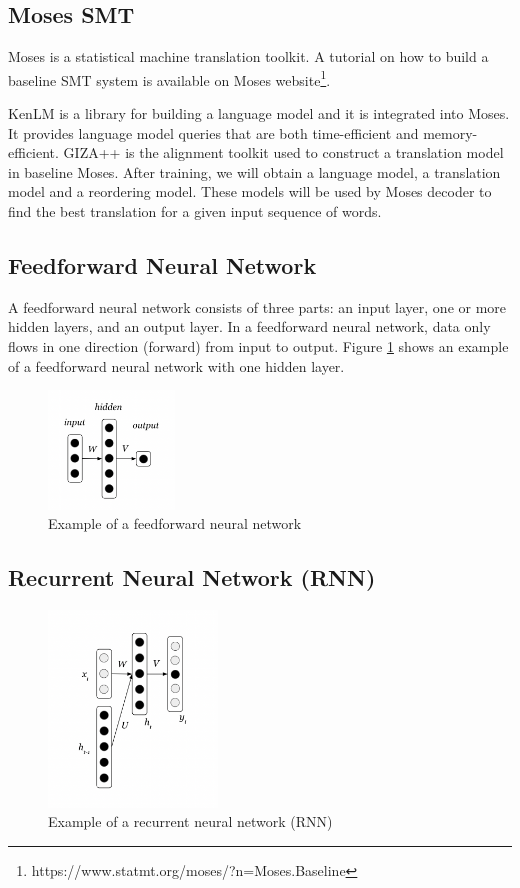 \documentclass[12pt,a4paper,twoside,openright]{report}
\begin{document}
\subsection{Moses SMT}
Moses\cite{moses} is a statistical machine translation toolkit. A tutorial on how to build a baseline SMT system is available on Moses website\footnote{https://www.statmt.org/moses/?n=Moses.Baseline}. 

KenLM\cite{heafield-2011-kenlm} is a library for building a language model and it is integrated into Moses. It provides language model queries that are both time-efficient and memory-efficient. GIZA++\cite{giza_pp} is the alignment toolkit used to construct a translation model in baseline Moses. After training, we will obtain a language model, a translation model and a reordering model. These models will be used by Moses decoder to find the best translation for a given input sequence of words.

\subsection{Feedforward Neural Network}
A feedforward neural network consists of three parts: an input layer, one or more hidden layers, and an output layer. In a feedforward neural network, data only flows in one direction (forward) from input to output. Figure \ref{fig:fnn} shows an example of a feedforward neural network with one hidden layer.

\begin{figure}[ht]
\centering
\includegraphics[width=0.3\textwidth]{images/fnn.png}
\caption{Example of a feedforward neural network}
\label{fig:fnn}
\end{figure}

\subsection{Recurrent Neural Network (RNN)}

\begin{figure}[ht]
\centering
\includegraphics[width=0.4\textwidth]{images/rnn.png}
\caption{Example of a recurrent neural network (RNN)}
\label{fig:rnn}
\end{figure}
\end{document}
